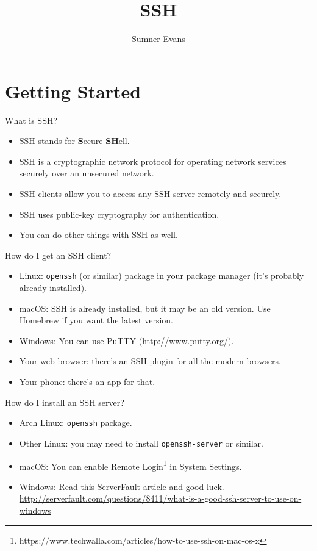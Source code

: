 \documentclass{lug}
\title{SSH}
\author{Sumner Evans}
\institute{Mines Linux Users Group}
\begin{document}
\section{Getting Started}

\begin{frame}{What is SSH?}
    \begin{itemize}[<+->]
        \item SSH stands for \textbf{S}ecure \textbf{SH}ell.
        \item SSH is a cryptographic network protocol for operating network
            services securely over an unsecured network.
        \item SSH clients allow you to access any SSH server remotely and
            securely.
        \item SSH uses public-key cryptography for authentication.
        \item You can do other things with SSH as well.
    \end{itemize}
\end{frame}

\begin{frame}{How do I get an SSH client?}
    \begin{itemize}
        \item Linux: \texttt{openssh} (or similar) package in your package
            manager (it's probably already installed).
        \item macOS: SSH is already installed, but it may be an old version. Use
            Homebrew if you want the latest version.
        \item Windows: You can use PuTTY (\url{http://www.putty.org/}).
        \item Your web browser: there's an SSH plugin for all the modern
            browsers.
        \item Your phone: there's an app for that.
    \end{itemize}
\end{frame}

\begin{frame}{How do I install an SSH server?}
    \begin{itemize}
        \item Arch Linux: \texttt{openssh} package.
        \item Other Linux: you may need to install \texttt{openssh-server} or
            similar.
        \item macOS: You can enable Remote
            Login\footnote{https://www.techwalla.com/articles/how-to-use-ssh-on-mac-os-x}
            in System Settings.
        \item Windows: Read this ServerFault article and good luck.
            \url{http://serverfault.com/questions/8411/what-is-a-good-ssh-server-to-use-on-windows}
    \end{itemize}
\end{frame}
\end{document}
